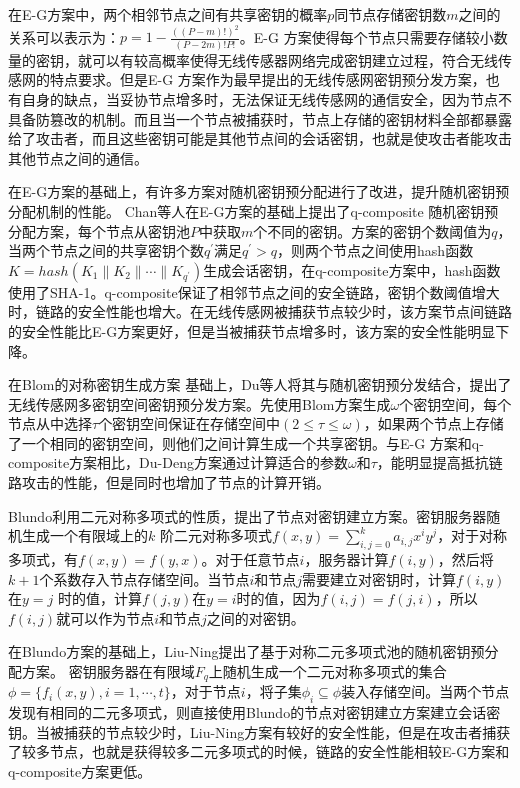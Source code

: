 在E-G方案中，两个相邻节点之间有共享密钥的概率$p$同节点存储密钥数$m$之间的关系可以表示为：$p=1-\frac{((P-m)!)^2}{(P-2m)!P!}$。E-G 方案使得每个节点只需要存储较小数量的密钥，就可以有较高概率使得无线传感器网络完成密钥建立过程，符合无线传感网的特点要求。但是E-G 方案作为最早提出的无线传感网密钥预分发方案，也有自身的缺点，当妥协节点增多时，无法保证无线传感网的通信安全，因为节点不具备防篡改的机制。而且当一个节点被捕获时，节点上存储的密钥材料全部都暴露给了攻击者，而且这些密钥可能是其他节点间的会话密钥，也就是使攻击者能攻击其他节点之间的通信。

在E-G方案的基础上，有许多方案对随机密钥预分配进行了改进，提升随机密钥预分配机制的性能。
Chan等人在E-G方案的基础上提出了q-composite 随机密钥预分配方案，每个节点从密钥池$P$中获取$m$个不同的密钥。方案的密钥个数阈值为$q$，当两个节点之间的共享密钥个数$q^{'}$满足$q^{'}> q$，则两个节点之间使用hash函数$K=hash(K_1\| K_2\| \cdots \| K_{q^{'}})$生成会话密钥，在q-composite方案中，hash函数使用了SHA-1\cite{c2:sha1}。q-composite保证了相邻节点之间的安全链路，密钥个数阈值增大时，链路的安全性能也增大。在无线传感网被捕获节点较少时，该方案节点间链路的安全性能比E-G方案更好，但是当被捕获节点增多时，该方案的安全性能明显下降。


在Blom的对称密钥生成方案 基础上，Du等人将其与随机密钥预分发结合，提出了无线传感网多密钥空间密钥预分发方案。先使用Blom方案生成$\omega$个密钥空间，每个节点从中选择$\tau$个密钥空间保证在存储空间中$(2 \leq \tau \leq \omega)$，如果两个节点上存储了一个相同的密钥空间，则他们之间计算生成一个共享密钥。与E-G 方案和q-composite方案相比，Du-Deng方案通过计算适合的参数$\omega$和$\tau$，能明显提高抵抗链路攻击的性能，但是同时也增加了节点的计算开销。

Blundo利用二元对称多项式的性质，提出了节点对密钥建立方案。密钥服务器随机生成一个有限域上的$k$ 阶二元对称多项式$f(x,y)=\sum _{i,j=0}^k a_{i,j} x^i y^j$，对于对称多项式，有$f(x,y)=f(y,x)$。对于任意节点$i$，服务器计算$f(i,y)$，然后将$k+1$个系数存入节点存储空间。当节点$i$和节点$j$需要建立对密钥时，计算$f(i,y)$ 在$y=j$ 时的值，计算$f(j,y)$在$y=i$时的值，因为$f(i,j)=f(j,i)$，所以$f(i,j)$就可以作为节点$i$和节点$j$之间的对密钥。

在Blundo方案的基础上，Liu-Ning提出了基于对称二元多项式池的随机密钥预分配方案。
密钥服务器在有限域$F_q$上随机生成一个二元对称多项式的集合$\phi=\{f_i(x,y),i=1,\cdots,t\}$，对于节点$i$，将子集$\phi_i\subseteq \phi$装入存储空间。当两个节点发现有相同的二元多项式，则直接使用Blundo的节点对密钥建立方案建立会话密钥。当被捕获的节点较少时，Liu-Ning方案有较好的安全性能，但是在攻击者捕获了较多节点，也就是获得较多二元多项式的时候，链路的安全性能相较E-G方案和q-composite方案更低。

